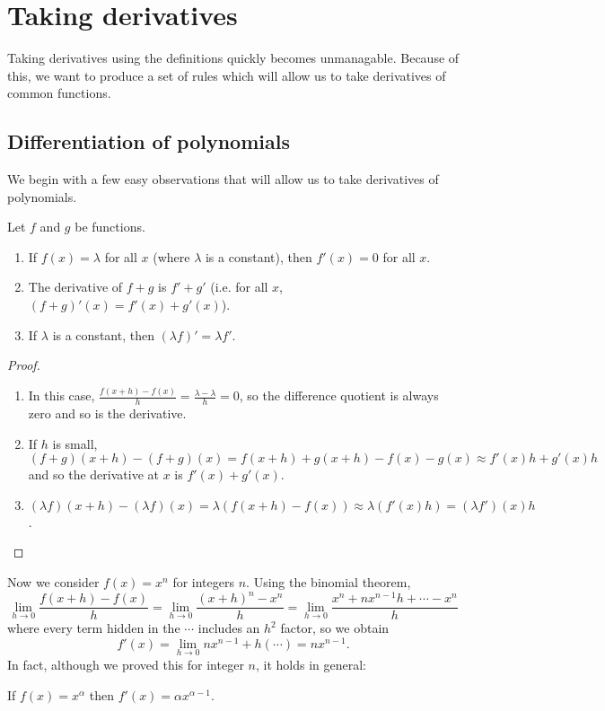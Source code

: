 \section{Taking derivatives}
Taking derivatives using the definitions quickly becomes unmanagable. Because of this,
we want to produce a set of rules which will allow us to take derivatives of common
functions.

\subsection{Differentiation of polynomials}
We begin with a few easy observations that will allow us to take derivatives of
polynomials.

\begin{thm}
  Let $ f $ and $ g $ be functions.
  \begin{enumerate}
    \item If $ f(x) = \lambda $ for all $ x $ (where $ \lambda $ is a constant), then $ f'(x) = 0 $ for all $ x $.
    \item The derivative of $ f + g $ is $ f' + g' $ (i.e. for all $ x $, $ (f + g)'(x) = f'(x) + g'(x) $).
    \item If $ \lambda $ is a constant, then $ (\lambda f)' = \lambda f' $.
  \end{enumerate}
\end{thm}
\begin{proof}
  \begin{enumerate}
    \item In this case, $ \frac{f(x + h) - f(x)}{h} = \frac{\lambda - \lambda}{h} = 0 $, so the difference quotient is always zero and so is the derivative.
    \item If $ h $ is small, $ (f + g)(x + h) - (f + g)(x) =  f(x + h) + g(x + h) - f(x) - g(x) \approx f'(x)h + g'(x)h $ and so the derivative at $ x $
          is $ f'(x) + g'(x) $.
    \item $ (\lambda f)(x + h) - (\lambda f)(x) = \lambda (f(x + h) - f(x)) \approx \lambda (f'(x) h) = (\lambda f')(x) h $.
  \end{enumerate}
\end{proof}

Now we consider $ f(x) = x^n $ for integers $ n $. Using the binomial theorem,
\begin{displaymath}
  \lim_{h \to 0} \frac{f(x + h) - f(x)}{h} = \lim_{h \to 0} \frac{(x + h)^n - x^n}{h} = \lim_{h \to 0} \frac{x^n + n x^{n - 1} h + \cdots - x^n}{h}
\end{displaymath}
where every term hidden in the $ \cdots $ includes an $ h^2 $ factor, so we obtain
\begin{equation}
  f'(x) = \lim_{h \to 0} n x^{n - 1} + h(\cdots) = nx^{n - 1}.
\end{equation}
In fact, although we proved this for integer $ n $, it holds in general:
\begin{thm}
  If $ f(x) = x^\alpha $ then $ f'(x) = \alpha x^{\alpha - 1} $.
\end{thm}

